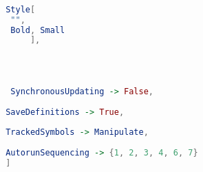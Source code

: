 \begin{lstlisting}[language=Mathematica,stepnumber=1,]
 
 
 Style[
  "",
  Bold, Small
      ],
 
 
 
 
  SynchronousUpdating -> False,
 
 SaveDefinitions -> True,
 
 TrackedSymbols -> Manipulate,
 
 AutorunSequencing -> {1, 2, 3, 4, 6, 7}
 ]
\end{lstlisting}


